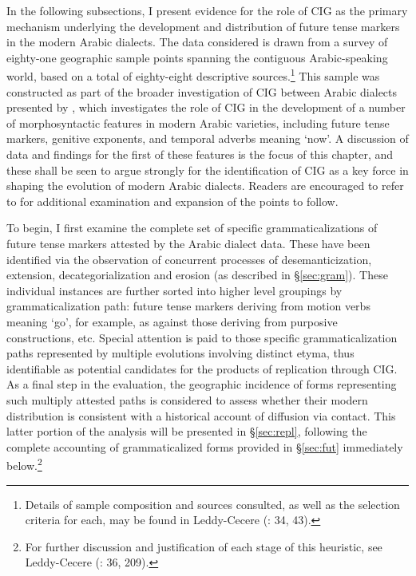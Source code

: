 \documentclass[output=paper]{langsci/langscibook}
\begin{document}
In the following subsections, I present evidence for the role of CIG as the primary mechanism underlying the development and distribution of future tense markers in the modern Arabic dialects. The data considered is drawn from a survey of eighty-one geographic sample points spanning the contiguous Arabic-speaking world, based on a total of eighty-eight descriptive sources.\footnote{Details of sample composition and sources consulted, as well as the selection criteria for each,  may be found in Leddy-Cecere (\citeyear{Leddy-Cecere2018}: 34, 43).} This sample was constructed as part of the broader investigation of CIG between Arabic dialects presented by \citet{Leddy-Cecere2018}, which investigates the role of CIG in the development of a number of morphosyntactic features in modern Arabic varieties, including future tense markers, genitive exponents, and temporal adverbs meaning ‘now’. A discussion of data and findings for the first of these features is the focus of this chapter, and these shall be seen to argue strongly for the identification of CIG as a key force in shaping the evolution of modern Arabic dialects.  Readers are encouraged to refer to \citet{Leddy-Cecere2018} for additional examination and expansion of the points to follow.

To begin, I first examine the complete set of specific grammaticalizations of future tense markers attested by the Arabic dialect data. These have been identified via the observation of concurrent processes of desemanticization, extension, decategorialization and erosion (as described in §\ref{sec:gram}). These individual instances are further sorted into higher level groupings by grammaticalization path: future tense markers deriving from motion verbs meaning ‘go’, for example, as against those deriving from purposive constructions, etc. Special attention is paid to those specific grammaticalization paths represented by multiple evolutions involving distinct etyma, thus identifiable as potential candidates for the products of replication through CIG. As a final step in the evaluation, the geographic incidence of forms representing such multiply attested paths is considered to assess whether their modern distribution is consistent with a historical account of diffusion via contact. This latter portion of the analysis will be presented in §\ref{sec:repl}, following the complete accounting of grammaticalized forms provided in §\ref{sec:fut} immediately below.\footnote{For further discussion and justification of each stage of this heuristic, see Leddy-Cecere (\citeyear{Leddy-Cecere2018}: 36, 209).}
\end{document}
